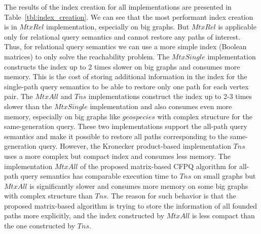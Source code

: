 The results of the index creation for all implementations are presented in Table~\ref{tbl:index_creation}. We can see that the most performant index creation is in $MtxRel$ implementation, especially on big graphs. But $MtxRel$ is applicable only for relational query semantics  and cannot restore any paths of interest. Thus, for relational query semantics we can use a more simple index (Boolean matrices) to only solve the reachability problem. The $MtxSingle$ implementation constructs the index up to 2 times slower on big graphs and consumes more memory. This is the cost of storing additional information in the index for the single-path query semantics to be able to restore only one path for each vertex pair. The $MtxAll$ and $Tns$ implementations construct the index up to 2-3 times slower than the $MtxSingle$ implementation and also consumes even more memory, especially on big graphs like $geospecies$ with complex structure for the same-generation query. These two implementations support the all-path query semantics and make it possible to restore all paths corresponding to the same-generation query. However, the Kronecker product-based implementation $Tns$ uses a more complex but compact index and consumes less memory. The implementation $MtxAll$ of the proposed matrix-based CFPQ algorithm for all-path query semantics has comparable execution time to $Tns$  on small graphs but $MtxAll$ is significantly slower and consumes more memory on some big graphs with complex structure than $Tns$. The reason for such behavior is that the proposed matrix-based algorithm is trying to store the information of all founded paths more explicitly, and the index constructed by $MtxAll$ is less compact than the one constructed by $Tns$.


